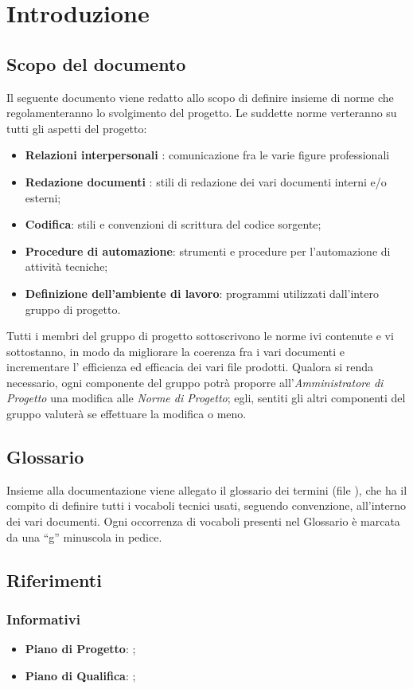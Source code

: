 \section{Introduzione}{
	\subsection{Scopo del documento}{
		Il seguente documento viene redatto allo scopo di definire insieme di norme che regolamenteranno lo svolgimento del progetto. Le suddette norme verteranno su tutti gli aspetti del progetto:
		\begin{itemize}
        \item \textbf{Relazioni interpersonali} : comunicazione fra le varie figure professionali \item \textbf{Redazione documenti} : stili di redazione dei vari documenti interni e/o	esterni;
		\item \textbf{Codifica}: stili e convenzioni di scrittura del codice sorgente;
		\item \textbf{Procedure di automazione}: strumenti e procedure per l’automazione di attività tecniche;
		\item \textbf{Definizione dell’ambiente di lavoro}: programmi utilizzati dall’intero gruppo di progetto.
		\end{itemize}
		Tutti i membri del gruppo di progetto sottoscrivono le norme ivi contenute e vi	sottostanno, in modo da migliorare la coerenza fra i vari documenti e incrementare l' efficienza ed efficacia dei vari file prodotti.	Qualora si renda necessario, ogni componente del gruppo potrà proporre all’\emph{Amministratore di Progetto} una modifica alle \emph{Norme di Progetto}; egli, sentiti gli altri componenti del gruppo valuterà se effettuare la modifica o meno.
		
	 }
	\subsection{Glossario}{ 
	Insieme alla documentazione viene allegato il glossario dei termini (file \href{run:../../Esterni/\fGlossario}{\fEscapeGlossario}), che ha il compito di definire tutti i vocaboli tecnici usati, seguendo convenzione, all’interno dei vari documenti.  Ogni occorrenza di vocaboli presenti nel Glossario è marcata da una “g” minuscola in pedice.	
	}
}
   \subsection{Riferimenti}
     \subsubsection{Informativi}
     \begin{itemize}
       \item \textbf{Piano di Progetto}: \href{run:../../Interni/\fPianoDiProgetto}{\fEscapePianoDiProgetto};
       \item \textbf{Piano di Qualifica}:  \href{run:../../Esterni/\fPianoDiQualifica}{\fEscapePianoDiQualifica};
     \end{itemize}
        